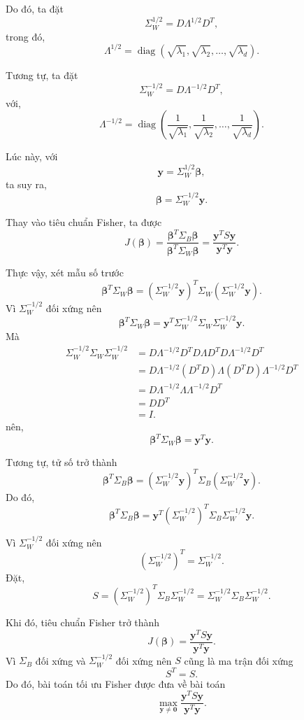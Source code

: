 Do đó, ta đặt
\[
\Sigma_W^{1/2}
=
D\Lambda^{1/2}D^T,
\]
trong đó,
\[
\Lambda^{1/2}
=
\operatorname{diag}
\left(
\sqrt{\lambda_1},
\sqrt{\lambda_2},
\ldots,
\sqrt{\lambda_d}
\right).
\]

Tương tự, ta đặt
\[
\Sigma_W^{-1/2}
=
D\Lambda^{-1/2}D^T,
\]
với,
\[
\Lambda^{-1/2}
=
\operatorname{diag}
\left(
\frac{1}{\sqrt{\lambda_1}},
\frac{1}{\sqrt{\lambda_2}},
\ldots,
\frac{1}{\sqrt{\lambda_d}}
\right).
\]

Lúc này, với
\[
\bm{y}
=
\Sigma_W^{1/2}\bm{\beta},
\]
ta suy ra,
\[
\bm{\beta}
=
\Sigma_W^{-1/2}\bm{y}.
\tag{*}
\label{*}
\]

Thay vào tiêu chuẩn Fisher, ta được
\[
J(\bm{\beta})
=
\frac{\bm{\beta}^T \Sigma_B \bm{\beta}}
{\bm{\beta}^T \Sigma_W \bm{\beta}}
=
\frac{\bm{y}^T S \bm{y}}{\bm{y}^T \bm{y}}.
\]

Thực vậy, xét mẫu số trước
\[
\bm{\beta}^T\Sigma_W\bm{\beta}
=
\left(\Sigma_W^{-1/2}\bm{y}\right)^T
\Sigma_W
\left(\Sigma_W^{-1/2}\bm{y}\right).
\]
Vì $\Sigma_W^{-1/2}$ đối xứng nên
\[
\bm{\beta}^T\Sigma_W\bm{\beta}
=
\bm{y}^T
\Sigma_W^{-1/2}
\Sigma_W
\Sigma_W^{-1/2}
\bm{y}.
\]
Mà
\[
\begin{aligned}
	\Sigma_W^{-1/2}
	\Sigma_W
	\Sigma_W^{-1/2}
	&=
	D\Lambda^{-1/2}D^T
	D\Lambda D^T
	D\Lambda^{-1/2}D^T \\[0.2cm]
	&=
	D\Lambda^{-1/2}
	(D^TD)
	\Lambda
	(D^TD)
	\Lambda^{-1/2}D^T \\[0.2cm]
	&=
	D\Lambda^{-1/2}
	\Lambda
	\Lambda^{-1/2}D^T \\[0.2cm]
	&=
	DD^T \\[0.2cm]
	&=
	I.
\end{aligned}
\]
nên,
\[
\bm{\beta}^T\Sigma_W\bm{\beta}
=
\bm{y}^T\bm{y}.
\]

Tương tự, tử số trở thành
\[
\bm{\beta}^T\Sigma_B\bm{\beta}
=
\left(\Sigma_W^{-1/2}\bm{y}\right)^T
\Sigma_B
\left(\Sigma_W^{-1/2}\bm{y}\right).
\]
Do đó,
\[
\bm{\beta}^T\Sigma_B\bm{\beta}
=
\bm{y}^T
\left(\Sigma_W^{-1/2}\right)^T
\Sigma_B
\Sigma_W^{-1/2}
\bm{y}.
\]

Vì $\Sigma_W^{-1/2}$ đối xứng nên
\[
\left(\Sigma_W^{-1/2}\right)^T
=
\Sigma_W^{-1/2}.
\]
Đặt,
\[
S
=
\left(\Sigma_W^{-1/2}\right)^T
\Sigma_B
\Sigma_W^{-1/2}
=
\Sigma_W^{-1/2}
\Sigma_B
\Sigma_W^{-1/2}.
\]

Khi đó, tiêu chuẩn Fisher trở thành
\[
J(\bm{\beta})
=
\frac{\bm{y}^T S \bm{y}}{\bm{y}^T\bm{y}}.
\]
Vì $\Sigma_B$ đối xứng và $\Sigma_W^{-1/2}$ đối xứng nên $S$ cũng là ma trận đối xứng
\[
S^T=S.
\]
Do đó, bài toán tối ưu Fisher được đưa về bài toán
\[
\max_{\bm{y}\neq \bm{0}}
\frac{\bm{y}^T S \bm{y}}{\bm{y}^T\bm{y}}.
\]

